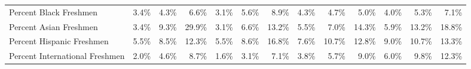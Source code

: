\documentclass[
  12pt,
]{article}
\begin{document}
\begin{landscape}
\begin{table}
{\begin{tabular}[t]{lrrrrrrrrrrrr}
Percent Black Freshmen & 3.4\% & 4.3\% & 6.6\% & 3.1\% & 5.6\% & 8.9\% & 4.3\% & 4.7\% & 5.0\% & 4.0\% & 5.3\% & 7.1\%\\
Percent Asian Freshmen & 3.4\% & 9.3\% & 29.9\% & 3.1\% & 6.6\% & 13.2\% & 5.5\% & 7.0\% & 14.3\% & 5.9\% & 13.2\% & 18.8\%\\
Percent Hispanic Freshmen & 5.5\% & 8.5\% & 12.3\% & 5.5\% & 8.6\% & 16.8\% & 7.6\% & 10.7\% & 12.8\% & 9.0\% & 10.7\% & 13.3\%\\
Percent International Freshmen & 2.0\% & 4.6\% & 8.7\% & 1.6\% & 3.1\% & 7.1\% & 3.8\% & 5.7\% & 9.0\% & 6.0\% & 9.8\% & 12.3\%\\
\bottomrule
\end{tabular}}
\end{table}

\clearpage

\begin{table}


\end{table}
\end{landscape}
\end{document}
